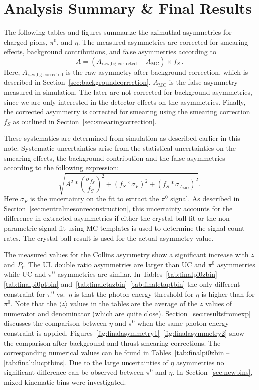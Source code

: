 \section{Analysis Summary \& Final Results}

The following tables and figures summarize the azimuthal asymmetries for charged pions, $\pi^0$, and $\eta$. 
The measured asymmetries are corrected for smearing effects, background contributions, and false asymmetries according to
\begin{equation}
A=(A_\textrm{raw,bg corrected}-A_\textrm{MC})\times f_S\, .
\end{equation}
Here, $A_\textrm{raw,bg corrected}$ is the raw asymmetry after background correction, which is described in Section~\ref{sec:backgroundcorrection}.
$A_\textrm{MC}$ is the false asymmetry measured in simulation. The later are not corrected for background asymmetries, since we are only interested in the detector effects on the asymmetries.
Finally, the corrected asymmetry is corrected for smearing using the smearing correction $f_S$ as outlined in Section~\ref{sec:smearingcorrection}.

These systematics are determined from simulation as described earlier in this note. Systematic uncertainties arise from the statistical uncertainties on the smearing effects, the background contribution and the false asymmetries according to the following expression:
\begin{equation}
\sqrt{ A^2*(\frac{\sigma_{f_S}}{f_S})^2+(f_S*\sigma_F)^2+(f_S*\sigma_{A_\textrm{MC}})^2}.
 \end{equation}
 Here $\sigma_F$ is the uncertainty on the fit to extract the $\pi^0$ signal. As described in Section~\ref{sec:neutralmesonreconstruction}, this uncertainty accounts for the difference in extracted asymmetries if either the crystal-ball fit or the non-parametric signal fit using MC templates is used to determine the signal count rates. The crystal-ball result is used for the actual asymmetry value.
 
The measured values for the Collins asymmetry show a significant increase with $z$ and $P_t$. The UL double ratio asymmetries are larger than UC and $\pi^0$ asymmetries while UC and $\pi^0$ asymmetries are similar. 
In Tables~\ref{tab:finalpi0zbin}--\ref{tab:finalpi0ptbin} and~\ref{tab:finaletazbin}--\ref{tab:finaletaptbin} the only different constraint for $\pi^0$ vs.~$\eta$ is that the photon-energy threshold for $\eta$ is higher than for $\pi^0$. 
Note that the $\langle z \rangle$ values in the tables are the average of the $z$ values of numerator and denominator (which are quite close).
Section~\ref{sec:resultsfromexp} discusses the comparison between $\eta$ and $\pi^0$ when the same photon-energy constraint is applied. 
Figures~\ref{fig:finalasymmetry1}--\ref{fig:finalasymmetry2} show the comparison after background and thrust-smearing corrections. 
The corresponding numerical values can be found in Tables~\ref{tab:finalpi0zbin}--\ref{tab:finalulucptbins}. 
Due to the large uncertainties of $\eta$ asymmetries no significant difference can be observed between $\pi^0$ and $\eta$. 
In Section~\ref{sec:newbins}, mixed kinematic bins were investigated. 

